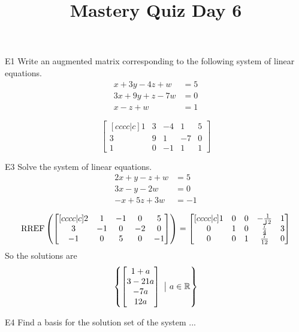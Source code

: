 \documentclass{sbgLAquiz}
\title{Mastery Quiz Day 6 }
\begin{document}
\begin{problem}{E1}
Write an augmented matrix corresponding to the following system of linear equations.
\begin{align*}
x+3y-4z +w &= 5 \\
3x+9y+z-7w &= 0 \\
x-z +w &= 1
\end{align*}
\end{problem}
\begin{solution}
$$\begin{bmatrix}[cccc|c]
1 & 3 & -4 & 1 & 5 \\
3 & 9 & 1 & -7 & 0 \\
1 & 0 & -1 & 1 &  1 
\end{bmatrix}$$
\end{solution}
\begin{problem}{E3} 
Solve the system of linear equations.
\begin{align*}
2x+y-z+w &=5 \\
3x-y-2w &= 0 \\
-x+5z+3w&=-1
\end{align*}
\end{problem}
\begin{solution}
$$\operatorname{RREF}\left( \begin{bmatrix}[cccc|c] 2 & 1 & -1 & 0 & 5 \\ 3 & -1 & 0 & -2 & 0 \\ -1 & 0 & 5 & 0 & -1 \end{bmatrix} \right) = \begin{bmatrix}[cccc|c] 1 & 0 & 0 & -\frac{1}{12} & 1 \\ 0 & 1 & 0 & \frac{7}{4} & 3 \\ 0 & 0 & 1 & \frac{7}{12} & 0 \end{bmatrix}$$
So the solutions are $$\left\{ \begin{bmatrix} 1+a \\ 3-21a \\ -7a \\ 12a \end{bmatrix}\ \big|\ a \in \mathbb{R}\right\}$$
\end{solution}
\begin{extract}\newpage\end{extract}
\begin{problem}{E4}
Find a basis for the solution set of the system ...
\end{problem}
\end{document}
